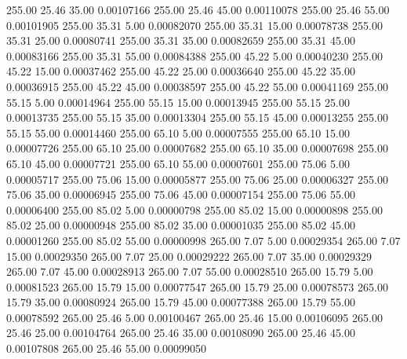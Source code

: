     255.00     25.46     35.00     0.00107166
    255.00     25.46     45.00     0.00110078
    255.00     25.46     55.00     0.00101905
    255.00     35.31      5.00     0.00082070
    255.00     35.31     15.00     0.00078738
    255.00     35.31     25.00     0.00080741
    255.00     35.31     35.00     0.00082659
    255.00     35.31     45.00     0.00083166
    255.00     35.31     55.00     0.00084388
    255.00     45.22      5.00     0.00040230
    255.00     45.22     15.00     0.00037462
    255.00     45.22     25.00     0.00036640
    255.00     45.22     35.00     0.00036915
    255.00     45.22     45.00     0.00038597
    255.00     45.22     55.00     0.00041169
    255.00     55.15      5.00     0.00014964
    255.00     55.15     15.00     0.00013945
    255.00     55.15     25.00     0.00013735
    255.00     55.15     35.00     0.00013304
    255.00     55.15     45.00     0.00013255
    255.00     55.15     55.00     0.00014460
    255.00     65.10      5.00     0.00007555
    255.00     65.10     15.00     0.00007726
    255.00     65.10     25.00     0.00007682
    255.00     65.10     35.00     0.00007698
    255.00     65.10     45.00     0.00007721
    255.00     65.10     55.00     0.00007601
    255.00     75.06      5.00     0.00005717
    255.00     75.06     15.00     0.00005877
    255.00     75.06     25.00     0.00006327
    255.00     75.06     35.00     0.00006945
    255.00     75.06     45.00     0.00007154
    255.00     75.06     55.00     0.00006400
    255.00     85.02      5.00     0.00000798
    255.00     85.02     15.00     0.00000898
    255.00     85.02     25.00     0.00000948
    255.00     85.02     35.00     0.00001035
    255.00     85.02     45.00     0.00001260
    255.00     85.02     55.00     0.00000998
    265.00      7.07      5.00     0.00029354
    265.00      7.07     15.00     0.00029350
    265.00      7.07     25.00     0.00029222
    265.00      7.07     35.00     0.00029329
    265.00      7.07     45.00     0.00028913
    265.00      7.07     55.00     0.00028510
    265.00     15.79      5.00     0.00081523
    265.00     15.79     15.00     0.00077547
    265.00     15.79     25.00     0.00078573
    265.00     15.79     35.00     0.00080924
    265.00     15.79     45.00     0.00077388
    265.00     15.79     55.00     0.00078592
    265.00     25.46      5.00     0.00100467
    265.00     25.46     15.00     0.00106095
    265.00     25.46     25.00     0.00104764
    265.00     25.46     35.00     0.00108090
    265.00     25.46     45.00     0.00107808
    265.00     25.46     55.00     0.00099050
